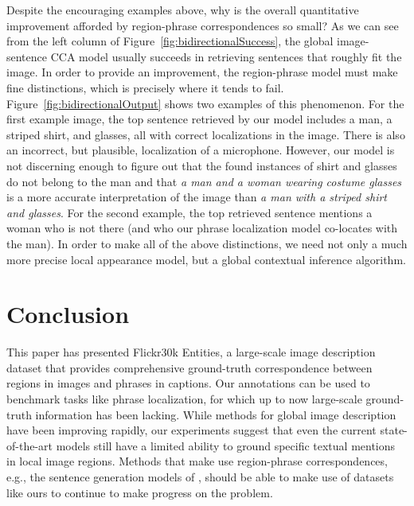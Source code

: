 \documentclass[twocolumn]{svjour3}
\begin{document}
Despite the encouraging examples above, why is the overall quantitative improvement afforded by region-phrase correspondences so small? As we can see from the left column of Figure~\ref{fig:bidirectionalSuccess}, the global image-sentence CCA model usually succeeds in retrieving sentences that roughly fit the image. In order to provide an improvement, the region-phrase model must make fine distinctions, which is precisely where it tends to fail. Figure~\ref{fig:bidirectionalOutput} shows two examples of this phenomenon. For the first example image, the top sentence retrieved by our model includes a man, a striped shirt, and glasses, all with correct localizations in the image. There is also an incorrect, but plausible, localization of a microphone. However, our model is not discerning enough to figure out that the found instances of shirt and glasses do not belong to the man and that {\em a man and a woman wearing costume glasses} is a more accurate interpretation of the image than {\em a man with a striped shirt and glasses}. For the second example, the top retrieved sentence mentions a woman who is not there (and who our phrase localization model co-locates with the man). In order to make all of the above distinctions, we need not only a much more precise local appearance model, but a global contextual inference algorithm.






 


\section{Conclusion}

This paper has presented Flickr30k Entities, a large-scale image description dataset that provides comprehensive ground-truth correspondence between regions in images and phrases in captions. Our annotations can be used to benchmark tasks like phrase localization, for which up to now large-scale ground-truth information has been lacking. While methods for global image description have been improving rapidly, our experiments suggest that even the current state-of-the-art models still have a limited ability to ground specific textual mentions in local image regions. Methods that make use region-phrase correspondences, e.g., the sentence generation models of \citet{karpathy2014deepNIPS,karpathy2014deep,fang2014captions}, should be able to make use of datasets like ours to continue to make progress on the problem. 
\end{document}
